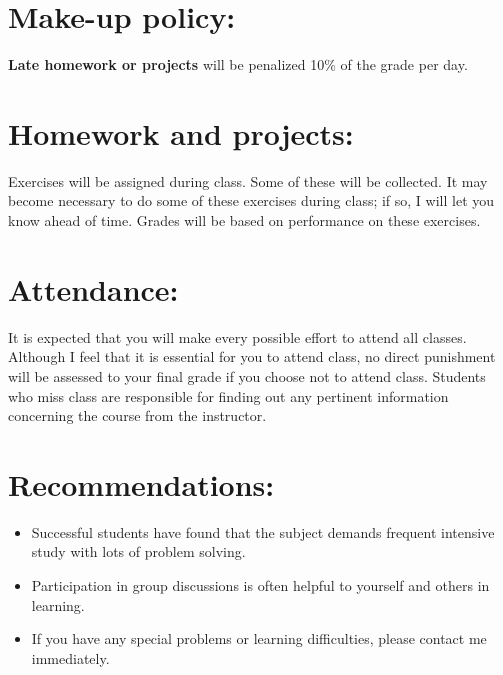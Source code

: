 \documentclass[11pt]{article}
\begin{document}
\section*{Make-up policy:}
\label{sec:orgheadline4}
\textbf{Late homework or projects} will be penalized 10\% of the grade per
day.

\section*{Homework and projects:}
\label{sec:orgheadline5}
Exercises will be assigned during class. Some of these will be
collected. It may become necessary to do some of these exercises
during class; if so, I will let you know ahead of time. Grades will be
based on performance on these exercises.

\section*{Attendance:}
\label{sec:orgheadline6}
It is expected that you will make every possible effort to attend all
classes. Although I feel that it is essential for you to attend class,
no direct punishment will be assessed to your final grade if you
choose not to attend class. Students who miss class are responsible
for finding out any pertinent information concerning the course from
the instructor.

\section*{Recommendations:}
\label{sec:orgheadline7}
\begin{itemize}
\item Successful students have found that the subject demands frequent
intensive study with lots of problem solving.
\item Participation in group discussions is often helpful to yourself and
others in learning.
\item If you have any special problems or learning difficulties, please
contact me immediately.
\end{itemize}
\end{document}
